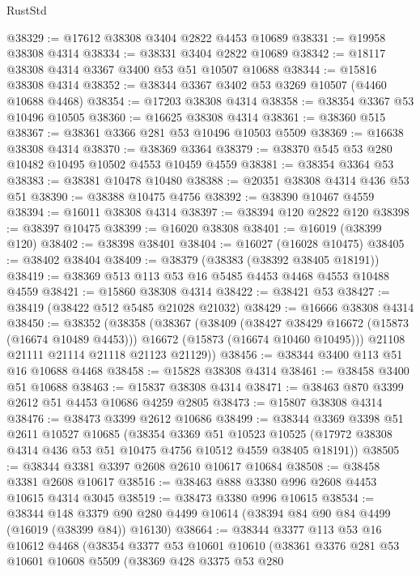 \begin{lexlean}{RustStd}
\begin{coremodule}
@38329 := @17612 @38308 @3404 @2822 @4453 @10689
@38331 := @19958 @38308 @4314
@38334 := @38331 @3404 @2822 @10689
@38342 := @18117 @38308 @4314 @3367 @3400 @53 @51 @10507 @10688
@38344 := @15816 @38308 @4314
@38352 := @38344 @3367 @3402 @53 @3269 @10507 (@4460 @10688 @4468)
@38354 := @17203 @38308 @4314
@38358 := @38354 @3367 @53 @10496 @10505
@38360 := @16625 @38308 @4314
@38361 := @38360 @515
@38367 := @38361 @3366 @281 @53 @10496 @10503 @5509
@38369 := @16638 @38308 @4314
@38370 := @38369 @3364
@38379 := @38370 @545 @53 @280 @10482 @10495 @10502 @4553 @10459 @4559
@38381 := @38354 @3364 @53
@38383 := @38381 @10478 @10480
@38388 := @20351 @38308 @4314 @436 @53 @51
@38390 := @38388 @10475 @4756
@38392 := @38390 @10467 @4559
@38394 := @16011 @38308 @4314
@38397 := @38394 @120 @2822 @120
@38398 := @38397 @10475
@38399 := @16020 @38308
@38401 := @16019 (@38399 @120)
@38402 := @38398 @38401
@38404 := @16027 (@16028 @10475)
@38405 := @38402 @38404
@38409 := @38379 (@38383 (@38392 @38405 @18191))
@38419 := @38369 @513 @113 @53 @16 @5485 @4453 @4468 @4553 @10488 @4559
@38421 := @15860 @38308 @4314
@38422 := @38421 @53
@38427 := @38419 (@38422 @512 @5485 @21028 @21032)
@38429 := @16666 @38308 @4314
@38450 := @38352
    (@38358
      (@38367
        (@38409
          (@38427 @38429 @16672 (@15873 (@16674 @10489 @4453)))
          @16672
          (@15873 (@16674 @10460 @10495)))
        @21108
        @21111
        @21114
        @21118
        @21123
        @21129))
@38456 := @38344 @3400 @113 @51 @16 @10688 @4468
@38458 := @15828 @38308 @4314
@38461 := @38458 @3400 @51 @10688
@38463 := @15837 @38308 @4314
@38471 := @38463 @870 @3399 @2612 @51 @4453 @10686 @4259 @2805
@38473 := @15807 @38308 @4314
@38476 := @38473 @3399 @2612 @10686
@38499 := @38344
    @3369
    @3398
    @51
    @2611
    @10527
    @10685
    (@38354
      @3369
      @51
      @10523
      @10525
      (@17972 @38308 @4314 @436 @53 @51 @10475 @4756 @10512 @4559 @38405 @18191))
@38505 := @38344 @3381 @3397 @2608 @2610 @10617 @10684
@38508 := @38458 @3381 @2608 @10617
@38516 := @38463 @888 @3380 @996 @2608 @4453 @10615 @4314 @3045
@38519 := @38473 @3380 @996 @10615
@38534 := @38344
    @148
    @3379
    @90
    @280
    @4499
    @10614
    (@38394 @84 @90 @84 @4499 (@16019 (@38399 @84)) @16130)
@38664 := @38344
    @3377
    @113
    @53
    @16
    @10612
    @4468
    (@38354
      @3377
      @53
      @10601
      @10610
      (@38361
        @3376
        @281
        @53
        @10601
        @10608
        @5509
        (@38369
          @428
          @3375
          @53
          @280

\end{coremodule}
\end{lexlean}
